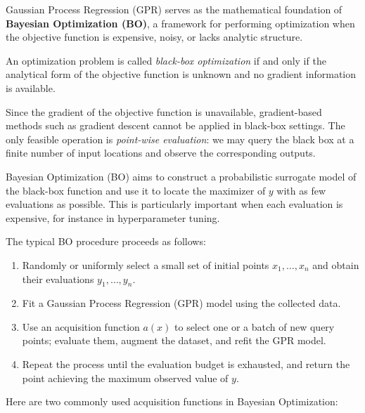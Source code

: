 \documentclass[../main]{subfiles}
\begin{document}
Gaussian Process Regression (GPR) serves as the mathematical foundation of
\textbf{Bayesian Optimization (BO)}, a framework for performing optimization
when the objective function is expensive, noisy, or lacks analytic structure.

\begin{definition}
An optimization problem is called \emph{black-box optimization} if and only if
the analytical form of the objective function is unknown and no gradient
information is available.
\end{definition}
Since the gradient of the objective function is unavailable, gradient-based
methods such as gradient descent cannot be applied in black-box settings.
The only feasible operation is \emph{point-wise evaluation}: we may query the
black box at a finite number of input locations and observe the corresponding
outputs.

Bayesian Optimization (BO) aims to construct a probabilistic surrogate model
of the black-box function and use it to locate the maximizer of $y$ with as
few evaluations as possible. This is particularly important when each
evaluation is expensive, for instance in hyperparameter tuning.

The typical BO procedure proceeds as follows:
\begin{enumerate}
    \item Randomly or uniformly select a small set of initial points
    $x_1,\ldots,x_n$ and obtain their evaluations $y_1,\ldots,y_n$.
    \item Fit a Gaussian Process Regression (GPR) model using the collected
    data.
    \item Use an acquisition function $a(x)$ to select one or a batch of new
    query points; evaluate them, augment the dataset, and refit the GPR model.
    \item Repeat the process until the evaluation budget is exhausted, and
    return the point achieving the maximum observed value of $y$.
\end{enumerate}
Here are two commonly used acquisition functions in Bayesian Optimization:
\end{document}
